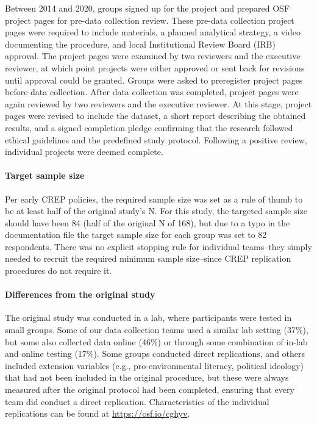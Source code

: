 \documentclass[
]{article}
\begin{document}
Between 2014 and 2020, groups signed up for the project and prepared OSF
project pages for pre-data collection review. These pre-data collection
project pages were required to include materials, a planned analytical
strategy, a video documenting the procedure, and local Institutional
Review Board (IRB) approval. The project pages were examined by two
reviewers and the executive reviewer, at which point projects were
either approved or sent back for revisions until approval could be
granted. Groups were asked to preregister project pages before data
collection. After data collection was completed, project pages were
again reviewed by two reviewers and the executive reviewer. At this
stage, project pages were revised to include the dataset, a short report
describing the obtained results, and a signed completion pledge
confirming that the research followed ethical guidelines and the
predefined study protocol. Following a positive review, individual
projects were deemed complete.

\paragraph{Target sample size}\label{target-sample-size}

Per early CREP policies, the required sample size was set as a rule of
thumb to be at least half of the original study's N. For this study, the
targeted sample size should have been 84 (half of the original N of
168), but due to a typo in the documentation file the target sample size
for each group was set to 82 respondents. There was no explicit stopping
rule for individual teams--they simply needed to recruit the required
minimum sample size--since CREP replication procedures do not require
it.

\paragraph{Differences from the original
study}\label{differences-from-the-original-study}

The original study was conducted in a lab, where participants were
tested in small groups. Some of our data collection teams used a similar
lab setting (37\%), but some also collected data online (46\%) or
through some combination of in-lab and online testing (17\%). Some
groups conducted direct replications, and others included extension
variables (e.g., pro-environmental literacy, political ideology) that
had not been included in the original procedure, but these were always
measured after the original protocol had been completed, ensuring that
every team did conduct a direct replication. Characteristics of the
individual replications can be found at \url{https://osf.io/cghyv}.
\end{document}
